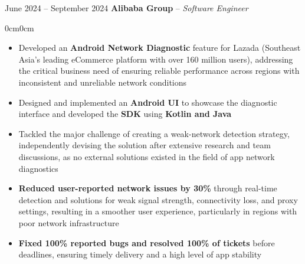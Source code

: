 \documentclass[8pt, letterpaper]{article}
\newenvironment{highlights}{
  \begin{itemize}[topsep=0.10cm,parsep=0.10cm,partopsep=0pt,itemsep=0pt,leftmargin=10pt]
}{
  \end{itemize}
}
\newenvironment{onecolentry}{
  \begin{adjustwidth}{0cm}{0cm}
}{
  \end{adjustwidth}
}
\begin{document}
\vspace{0.3cm}

\begin{twocolentryLarge}{June 2024 – September 2024}
\textbf{Alibaba Group} – \textit{Software Engineer}
\end{twocolentryLarge}
\begin{onecolentry}
\begin{highlights}
  \item Developed an \textbf{Android Network Diagnostic} feature for Lazada (Southeast Asia’s leading eCommerce platform with over 160 million users), addressing the critical business need of ensuring reliable performance across regions with inconsistent and unreliable network conditions
  \item Designed and implemented an \textbf{Android UI} to showcase the diagnostic interface and developed the \textbf{SDK} using \textbf{Kotlin and Java}
  \item Tackled the major challenge of creating a weak-network detection strategy, independently devising the solution after extensive research and team discussions, as no external solutions existed in the field of app network diagnostics
  \item \textbf{Reduced user-reported network issues by 30\%} through real-time detection and solutions for weak signal strength, connectivity loss, and proxy settings, resulting in a smoother user experience, particularly in regions with poor network infrastructure
  \item \textbf{Fixed 100\% reported bugs and resolved 100\% of tickets} before deadlines, ensuring timely delivery and a high level of app stability
\end{highlights}
\end{onecolentry}

\end{document}
